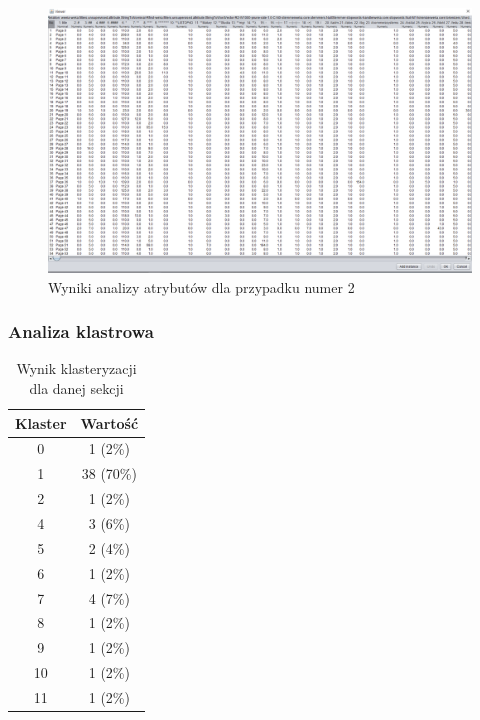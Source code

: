 \documentclass[../EDI_Task2_Karwowski_Kowalewski.tex]{subfiles}
\begin{document}
{{{            \begin{figure}[!htbp]
                \centering
                \includegraphics[width=\textwidth]{img/results2/weeia-case2.png}
                \caption{Wyniki analizy atrybutów dla przypadku numer 2}
            \end{figure}
            \FloatBarrier
        }

        \subsubsection{Analiza klastrowa} {

            \begin{table}[!htbp]
                \small
                \centering
                \begin{tabular}{|c|c|}
                    \hline
                    Klaster & Wartość \\ \hline
                    0    &   1 (2\%) \\
                    1    &  38 (70\%) \\
                    2    &   1 (2\%) \\
                    4    &   3 (6\%) \\
                    5    &   2 (4\%) \\
                    6    &   1 (2\%) \\
                    7    &   4 (7\%) \\
                    8    &   1 (2\%) \\
                    9    &   1 (2\%) \\
                    10   &   1 (2\%) \\
                    11   &   1 (2\%) \\ \hline
                \end{tabular}
                \caption{Wynik klasteryzacji dla danej sekcji}
            \end{table}
            \FloatBarrier
        }
    }

}
\end{document}
